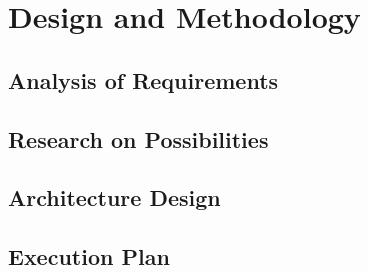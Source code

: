 \chapter{Design and Methodology}
\label{chap:design}

\section{Analysis of Requirements}

\section{Research on Possibilities}

\section{Architecture Design}

\section{Execution Plan}

